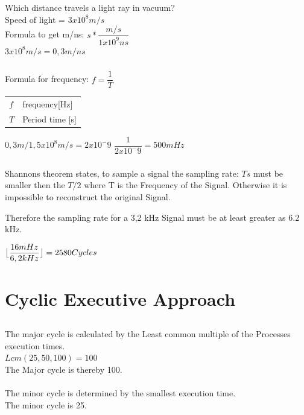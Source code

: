 \documentclass{article}
\DeclarePairedDelimiter{\floor}{\lfloor}{\rfloor}
\begin{document}
\subsubsection{}
Which distance travels a light ray in vacuum?\\
Speed of light = $3x10^8 m/s$\\
Formula to get m/ns: $s *\dfrac{m/s}{1x10^9ns}$\\
$3x10^8m/s = 0,3 m/ns$
\subsubsection{}
Formula for frequency: $ f = \dfrac{1}{T}$

\begin{tabular}{ll}
$f$ & frequency[Hz]\\
$T$ & Period time  [s]\\
\end{tabular}

$0,3m / 1,5x10^8 m/s = 2x10^-9$
$\dfrac{1}{2x10^-9}= 500mHz$

\subsubsection{}
Shannons theorem states, to sample a signal the sampling rate: $Ts$ must be smaller then the $T/2$ where T  is the Frequency of the Signal.
Otherwise it is impossible to reconstruct the original Signal.

Therefore the sampling rate for a  3,2 kHz Signal must be at least greater as 6.2 kHz.

$\floor[\big]{\dfrac{16mHz}{6,2kHz}} = 2580  Cycles $


\section{ Cyclic Executive Approach}

\subsection{}
The major cycle is calculated by the Least common multiple of the Processes execution times.\\
$Lcm(25,50,100)=100$ \\
The Major cycle is thereby 100.\\
\\
The minor cycle is determined by  the smallest execution time.\\
The minor cycle is 25.
\newpage
\end{document}
